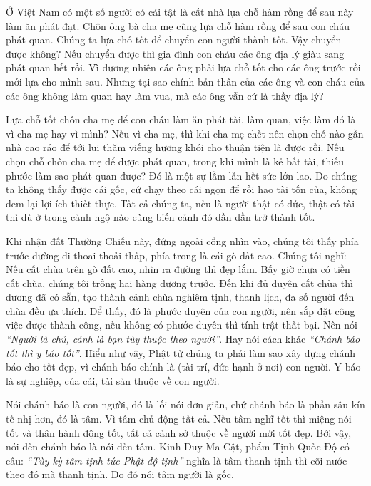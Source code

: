 \documentclass[
  12pt,
  oneside]{book}
\begin{document}
Ở Việt Nam có một số người có cái tật là cất nhà lựa chỗ hàm rồng để sau này làm ăn phát đạt. Chôn ông bà cha mẹ cũng lựa chỗ hàm rồng để sau con cháu phát quan. Chúng ta lựa chỗ tốt để chuyển con người thành tốt. Vậy chuyển được không? Nếu chuyển được thì gia đình con cháu các ông địa lý giàu sang phát quan hết rồi. Vì đương nhiên các ông phải lựa chỗ tốt cho các ông trước rồi mới lựa cho mình sau. Nhưng tại sao chính bản thân của các ông và con cháu của các ông không làm quan hay làm vua, mà các ông vẫn cứ là thầy địa lý?

Lựa chỗ tốt chôn cha mẹ để con cháu làm ăn phát tài, làm quan, việc làm đó là vì cha mẹ hay vì mình? Nếu vì cha mẹ, thì khi cha mẹ chết nên chọn chỗ nào gần nhà cao ráo để tới lui thăm viếng hương khói cho thuận tiện là được rồi. Nếu chọn chỗ chôn cha mẹ để được phát quan, trong khi mình là kẻ bất tài, thiếu phước làm sao phát quan được? Đó là một sự lầm lẫn hết sức lớn lao. Do chúng ta không thấy được cái gốc, cứ chạy theo cái ngọn để rồi hao tài tốn của, không đem lại lợi ích thiết thực. Tất cả chúng ta, nếu là người thật có đức, thật có tài thì dù ở trong cảnh ngộ nào cũng biến cảnh đó dần dần trở thành tốt.

Khi nhận đất Thường Chiếu này, đứng ngoài cổng nhìn vào, chúng tôi thấy phía trước đường đi thoai thoải thấp, phía trong là cái gò đất cao. Chúng tôi nghĩ: Nếu cất chùa trên gò đất cao, nhìn ra đường thì đẹp lắm. Bấy giờ chưa có tiền cất chùa, chúng tôi trồng hai hàng dương trước. Đến khi đủ duyên cất chùa thì dương đã có sẵn, tạo thành cảnh chùa nghiêm tịnh, thanh lịch, đa số người đến chùa đều ưa thích. Để thấy, đó là phước duyên của con người, nên sắp đặt công việc được thành công, nếu không có phước duyên thì tính trật thất bại. Nên nói \emph{``Người là chủ, cảnh là bạn tùy thuộc theo người''}. Hay nói cách khác \emph{``Chánh báo tốt thì y báo tốt''}. Hiểu như vậy, Phật tử chúng ta phải làm sao xây dựng chánh báo cho tốt đẹp, vì chánh báo chính là (tài trí, đức hạnh ở nơi) con người. Y báo là sự nghiệp, của cải, tài sản thuộc về con người.

Nói chánh báo là con người, đó là lối nói đơn giản, chứ chánh báo là phần sâu kín tế nhị hơn, đó là tâm. Vì tâm chủ động tất cả. Nếu tâm nghĩ tốt thì miệng nói tốt và thân hành động tốt, tất cả cảnh sở thuộc về người mới tốt đẹp. Bởi vậy, nói đến chánh báo là nói đến tâm. Kinh Duy Ma Cật, phẩm Tịnh Quốc Độ có câu: \emph{``Tùy kỳ tâm tịnh tức Phật độ tịnh''} nghĩa là tâm thanh tịnh thì cõi nước theo đó mà thanh tịnh. Do đó nói tâm người là gốc.
\end{document}
